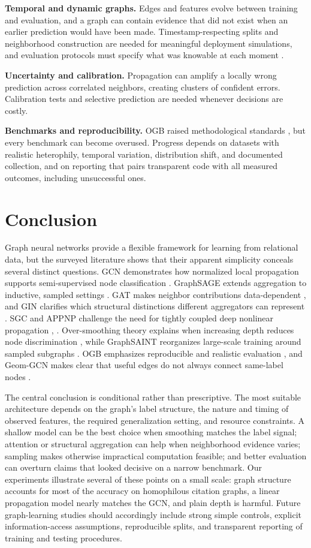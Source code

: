 \documentclass[conference]{IEEEtran}
\begin{document}
\textbf{Temporal and dynamic graphs.} Edges and features evolve between training and evaluation, and a graph can contain evidence that did not exist when an earlier prediction would have been made. Timestamp-respecting splits and neighborhood construction are needed for meaningful deployment simulations, and evaluation protocols must specify what was knowable at each moment \cite{b9}.

\textbf{Uncertainty and calibration.} Propagation can amplify a locally wrong prediction across correlated neighbors, creating clusters of confident errors. Calibration tests and selective prediction are needed whenever decisions are costly.

\textbf{Benchmarks and reproducibility.} OGB raised methodological standards \cite{b9}, but every benchmark can become overused. Progress depends on datasets with realistic heterophily, temporal variation, distribution shift, and documented collection, and on reporting that pairs transparent code with all measured outcomes, including unsuccessful ones.

\section{Conclusion}

Graph neural networks provide a flexible framework for learning from relational data, but the surveyed literature shows that their apparent simplicity conceals several distinct questions. GCN demonstrates how normalized local propagation supports semi-supervised node classification \cite{b1}. GraphSAGE extends aggregation to inductive, sampled settings \cite{b2}. GAT makes neighbor contributions data-dependent \cite{b3}, and GIN clarifies which structural distinctions different aggregators can represent \cite{b4}. SGC and APPNP challenge the need for tightly coupled deep nonlinear propagation \cite{b5}, \cite{b6}. Over-smoothing theory explains when increasing depth reduces node discrimination \cite{b7}, while GraphSAINT reorganizes large-scale training around sampled subgraphs \cite{b8}. OGB emphasizes reproducible and realistic evaluation \cite{b9}, and Geom-GCN makes clear that useful edges do not always connect same-label nodes \cite{b10}.

The central conclusion is conditional rather than prescriptive. The most suitable architecture depends on the graph's label structure, the nature and timing of observed features, the required generalization setting, and resource constraints. A shallow model can be the best choice when smoothing matches the label signal; attention or structural aggregation can help when neighborhood evidence varies; sampling makes otherwise impractical computation feasible; and better evaluation can overturn claims that looked decisive on a narrow benchmark. Our experiments illustrate several of these points on a small scale: graph structure accounts for most of the accuracy on homophilous citation graphs, a linear propagation model nearly matches the GCN, and plain depth is harmful. Future graph-learning studies should accordingly include strong simple controls, explicit information-access assumptions, reproducible splits, and transparent reporting of training and testing procedures.
\end{document}
